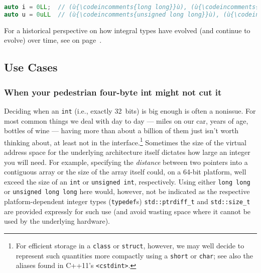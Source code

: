 \begin{lstlisting}[language=C++]
auto i = 0LL;  // (ù{\codeincomments{long long}}ù), (ù{\codeincomments{sizeof(i) * CHAR\_BIT >= 64}}ù)
auto u = 0uLL  // (ù{\codeincomments{unsigned long long}}ù), (ù{\codeincomments{sizeof(u) * CHAR\_BIT >= 64}}ù)
\end{lstlisting}

\noindent For a historical perspective on how integral types have evolved (and
continue to evolve) over time, see {\it{}} on page~\pageref{historical-perspective-on-the-evolution-of-use-of-fundamental-integral-types}.

\subsection[Use Cases]{Use Cases}\label{use-cases}

\subsubsection[When your pedestrian four-byte {\tt int} might not cut it]{When your pedestrian four-byte {\SubsubsecCode int} might not cut it}\label{when-your-pedestrian-four-byte-int-might-not-cut-it}

Deciding when an \texttt{int} (i.e., exactly 32~bits) is big enough is
often a nonissue. For most common things we deal with day to day ---
miles on our car, years of age, bottles of wine --- having more than about a
billion of them just isn't worth thinking about, at least not in the
interface.{\cprotect\footnote{For efficient storage in a \texttt{class}
or \texttt{struct}, however, we may well decide to represent such
quantities more compactly using a \texttt{short} or \texttt{char}; see
  also the aliases found in C++11's \texttt{<cstdint>}.}} Sometimes the size of the virtual address space for the
underlying architecture itself dictates how large an integer you will
need. For example, specifying the \emph{distance} between two pointers
into a contiguous array or the size of the array itself could, on a
64-bit platform, well exceed the size of an \texttt{int} or
\texttt{unsigned}~\texttt{int}, respectively. Using either
\texttt{long}~\texttt{long} or
\texttt{unsigned}~\texttt{long}~\texttt{long} here would, however, not
be indicated as the respective platform-dependent integer types
(\texttt{typedef}s) \texttt{std::ptrdiff\_t} and \texttt{std::size\_t}
are provided expressly for such use (and avoid wasting space where it
cannot be used by the underlying hardware).

